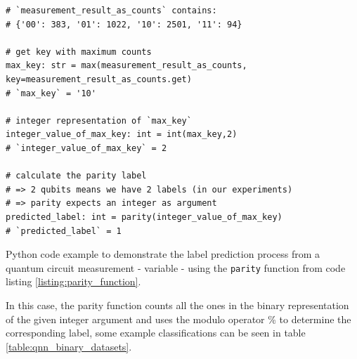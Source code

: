 \begin{listing}[!h]
    \begin{verbatim}
# `measurement_result_as_counts` contains: 
# {'00': 383, '01': 1022, '10': 2501, '11': 94}

# get key with maximum counts
max_key: str = max(measurement_result_as_counts, key=measurement_result_as_counts.get)
# `max_key` = '10'

# integer representation of `max_key`
integer_value_of_max_key: int = int(max_key,2)
# `integer_value_of_max_key` = 2

# calculate the parity label
# => 2 qubits means we have 2 labels (in our experiments)
# => parity expects an integer as argument
predicted_label: int = parity(integer_value_of_max_key)
# `predicted_label` = 1
    \end{verbatim}
    \caption{Python code example to demonstrate the label prediction process from a quantum circuit measurement - variable  - using the \texttt{parity} function from code listing \ref{listing:parity_function}.}
    \label{listing:parity_function_demonstration_example}
\end{listing}

In this case, the parity function counts all the ones in the binary representation of the given integer argument and uses the modulo operator \% to determine the corresponding label, some example classifications can be seen in table \ref{table:qnn_binary_datasets}.

\begin{table}[!h]
	\centering
	\caption{Example calculation of labels using the \texttt{parity} function (code listing \ref{listing:parity_function}) with \texttt{NUMBER_OF_LABELS = 3} three labels (classes) showing all possible outcomes from a three qubit circuit measurement.}
	\label{table:qnn_binary_datasets}
\end{table}

